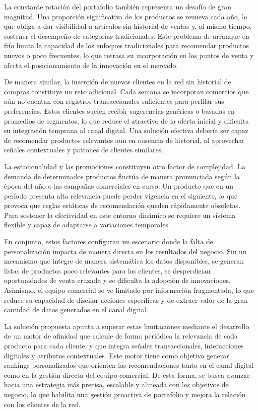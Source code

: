 La constante rotación del portafolio también representa un desafío de gran magnitud. Una proporción significativa de los productos se renueva cada año, lo que obliga a dar visibilidad a artículos sin historial de ventas y, al mismo tiempo, sostener el desempeño de categorías tradicionales. Este problema de arranque en frío limita la capacidad de los enfoques tradicionales para recomendar productos nuevos o poco frecuentes, lo que retrasa su incorporación en los puntos de venta y afecta el posicionamiento de la innovación en el mercado.

De manera similar, la inserción de nuevos clientes en la red sin historial de compras constituye un reto adicional. Cada semana se incorporan comercios que aún no cuentan con registros transaccionales suficientes para perfilar sus preferencias. Estos clientes suelen recibir sugerencias genéricas o basadas en promedios de segmentos, lo que reduce el atractivo de la oferta inicial y dificulta su integración temprana al canal digital. Una solución efectiva debería ser capaz de recomendar productos relevantes aun en ausencia de historial, al aprovechar señales contextuales y patrones de clientes similares.

La estacionalidad y las promociones constituyen otro factor de complejidad. La demanda de determinados productos fluctúa de manera pronunciada según la época del año o las campañas comerciales en curso. Un producto que en un período presenta alta relevancia puede perder vigencia en el siguiente, lo que provoca que reglas estáticas de recomendación queden rápidamente obsoletas. Para sostener la efectividad en este entorno dinámico se requiere un sistema flexible y capaz de adaptarse a variaciones temporales.

En conjunto, estos factores configuran un escenario donde la falta de personalización impacta de manera directa en los resultados del negocio. Sin un mecanismo que integre de manera sistemática los datos disponibles, se generan listas de productos poco relevantes para los clientes, se desperdician oportunidades de venta cruzada y se dificulta la adopción de innovaciones. Asimismo, el equipo comercial se ve limitado por información fragmentada, lo que reduce su capacidad de diseñar acciones específicas y de extraer valor de la gran cantidad de datos generados en el canal digital.

La solución propuesta apunta a superar estas limitaciones mediante el desarrollo de un motor de afinidad que calcule de forma periódica la relevancia de cada producto para cada cliente, y que integra señales transaccionales, interacciones digitales y atributos contextuales. Este motor tiene como objetivo generar rankings personalizados que orienten las recomendaciones tanto en el canal digital como en la gestión directa del equipo comercial. De esta forma, se busca avanzar hacia una estrategia más precisa, escalable y alineada con los objetivos de negocio, lo que habilita una gestión proactiva de portafolio y mejora la relación con los clientes de la red.

